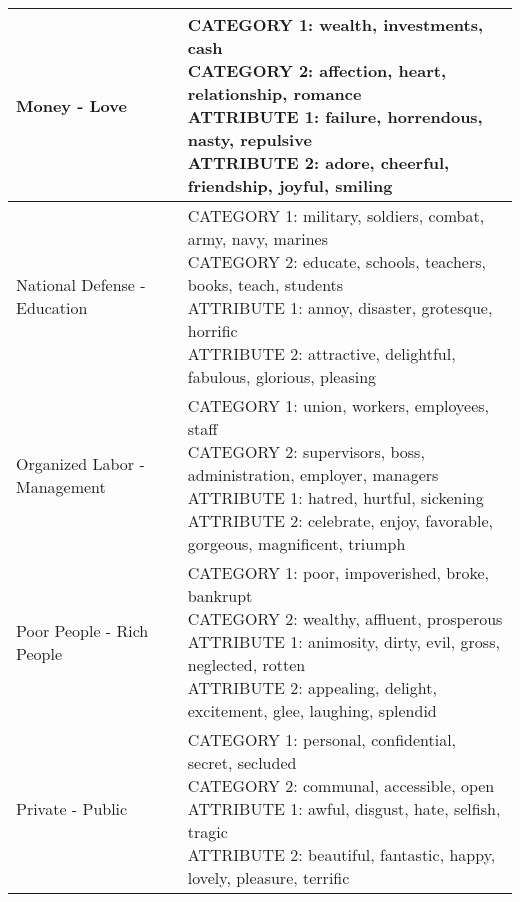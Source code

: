\documentclass[]{article}
\begin{document}
\begin{table}[H]
\begin{tabular}{l|l}
\hline
Money - Love & \makecell[l]{CATEGORY 1:  wealth, investments, cash \\ CATEGORY 2:  affection, heart, relationship, romance \\ ATTRIBUTE 1:  failure, horrendous, nasty, repulsive \\ ATTRIBUTE 2:  adore, cheerful, friendship, joyful, smiling \\}\\
\hline
National Defense - Education & \makecell[l]{CATEGORY 1:  military, soldiers, combat, army, navy, marines \\ CATEGORY 2:  educate, schools, teachers, books, teach, students \\ ATTRIBUTE 1:  annoy, disaster, grotesque, horrific \\ ATTRIBUTE 2:  attractive, delightful, fabulous, glorious, pleasing \\}\\
\hline
Organized Labor - Management & \makecell[l]{CATEGORY 1:  union, workers, employees, staff \\ CATEGORY 2:  supervisors, boss, administration, employer, managers \\ ATTRIBUTE 1:  hatred, hurtful, sickening \\ ATTRIBUTE 2:  celebrate, enjoy, favorable, gorgeous, magnificent, triumph \\}\\
\hline
Poor People - Rich People & \makecell[l]{CATEGORY 1:  poor, impoverished, broke, bankrupt \\ CATEGORY 2:  wealthy, affluent, prosperous \\ ATTRIBUTE 1:  animosity, dirty, evil, gross, neglected, rotten \\ ATTRIBUTE 2:  appealing, delight, excitement, glee, laughing, splendid \\}\\
\hline
Private - Public & \makecell[l]{CATEGORY 1:  personal, confidential, secret, secluded \\ CATEGORY 2:  communal, accessible, open \\ ATTRIBUTE 1:  awful, disgust, hate, selfish, tragic \\ ATTRIBUTE 2:  beautiful, fantastic, happy, lovely, pleasure, terrific \\}\\
\hline
\end{tabular}
\endgroup{}
\end{table}
\end{document}
